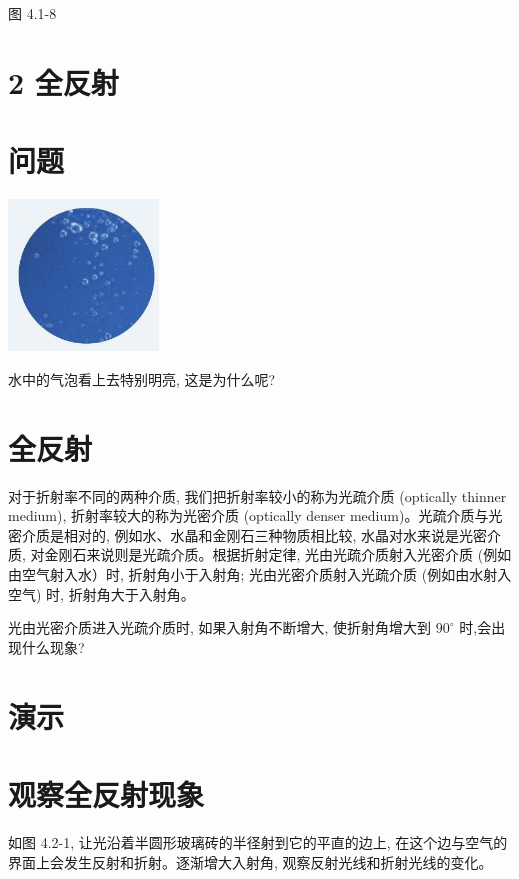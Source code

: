 \documentclass[10pt]{article}
\begin{document}
图 4.1-8

\section*{2 全反射}

\section*{问题}

\begin{center}
\includegraphics[max width=0.3\textwidth]{images/01910e4c-ebb8-7d2c-8f2f-2375bc1d2d12_95_416311.jpg}
\end{center}

水中的气泡看上去特别明亮, 这是为什么呢?

\section*{全反射}

对于折射率不同的两种介质, 我们把折射率较小的称为光疏介质 (optically thinner medium), 折射率较大的称为光密介质 (optically denser medium)。光疏介质与光密介质是相对的, 例如水、水晶和金刚石三种物质相比较, 水晶对水来说是光密介质, 对金刚石来说则是光疏介质。根据折射定律, 光由光疏介质射入光密介质 (例如由空气射入水）时, 折射角小于入射角; 光由光密介质射入光疏介质 (例如由水射入空气) 时, 折射角大于入射角。

光由光密介质进入光疏介质时, 如果入射角不断增大, 使折射角增大到 \({90}^{ \circ }\) 时,会出现什么现象?

\section*{演示}

\section*{观察全反射现象}

如图 4.2-1, 让光沿着半圆形玻璃砖的半径射到它的平直的边上, 在这个边与空气的界面上会发生反射和折射。逐渐增大入射角, 观察反射光线和折射光线的变化。
\end{document}
